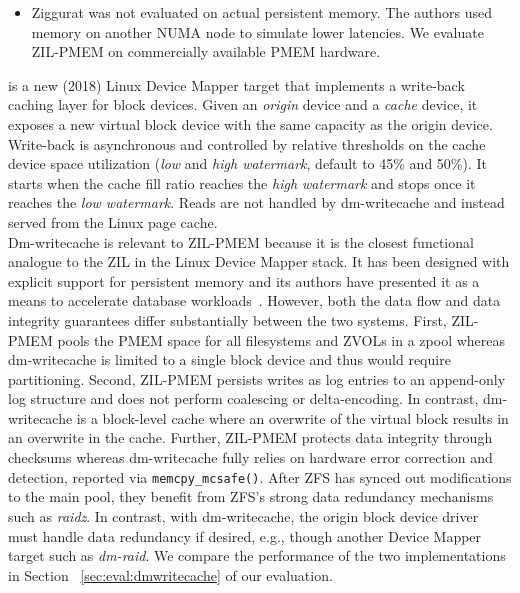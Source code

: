 \documentclass[12pt,a4paper,twoside]{book}
\begin{document}
\begin{itemize}[noitemsep,beginpenalty=100000,midpenalty=100000]
    \item Ziggurat was not evaluated on actual persistent memory. The authors used memory on another NUMA node to simulate lower latencies.
          We evaluate ZIL-PMEM on commercially available PMEM hardware.
\end{itemize}

 is a new (2018) Linux Device Mapper target that implements a write-back caching layer for block devices.
Given an \textit{origin} device and a \textit{cache} device, it exposes a new virtual block device with the same capacity as the origin device.
Write-back is asynchronous and controlled by relative thresholds on the cache device space utilization (\textit{low} and \textit{high watermark}, default to 45\% and 50\%).
It starts when the cache fill ratio reaches the \textit{high watermark} and stops once it reaches the \textit{low watermark}.
Reads are not handled by dm-writecache and instead served from the Linux page cache.~\cite{WritecacheTargetLinux}
\\
Dm-writecache is relevant to ZIL-PMEM because it is the closest functional analogue to the ZIL in the Linux Device Mapper stack.
It has been designed with explicit support for persistent memory and its authors have presented it as a means to accelerate database workloads~\cite{tadakamadlaAcceleratingDatabaseWorkloads2019}.
However, both the data flow and data integrity guarantees differ substantially between the two systems.
First, ZIL-PMEM pools the PMEM space for all filesystems and ZVOLs in a zpool whereas dm-writecache is limited to a single block device and thus would require partitioning.
Second, ZIL-PMEM persists writes as log entries to an append-only log structure and does not perform coalescing or delta-encoding.
In contrast, dm-writecache is a block-level cache where an overwrite of the virtual block results in an overwrite in the cache.
Further, ZIL-PMEM protects data integrity through checksums whereas dm-writecache fully relies on hardware error correction and detection, reported via \lstinline{memcpy_mcsafe()}.
After ZFS has synced out modifications to the main pool, they benefit from ZFS's strong data redundancy mechanisms such as \textit{raidz}.
In contrast, with dm-writecache, the origin block device driver must handle data redundancy if desired, e.g., though another Device Mapper target such as \textit{dm-raid}.
We compare the performance of the two implementations in Section ~\ref{sec:eval:dmwritecache} of our evaluation.
\end{document}
